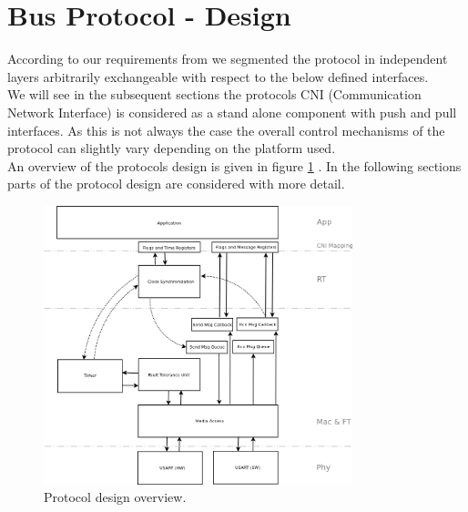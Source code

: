 \section{Bus Protocol - Design}
\label{sec:bus:design}
According to our requirements from \cite[NESD1]{NESD1} we segmented the protocol in 
independent layers arbitrarily exchangeable with respect to the below defined interfaces.\\

We will see in the subsequent sections the protocols CNI (Communication Network Interface) 
is considered as a stand alone component with push and pull interfaces.
As this is not always the case the overall control mechanisms of the 
protocol can slightly vary depending on the platform used.\\

An overview of the protocols design is given in figure 
\ref{fig:bus:design:overview} . 
In the following sections parts of the protocol design are considered with more detail.

\begin{figure}[h]
\centering
\includegraphics[width=0.8\textwidth]{../images/protocol_design_overview.png}
\caption{Protocol design overview.}
\label{fig:bus:design:overview}
\end{figure}






